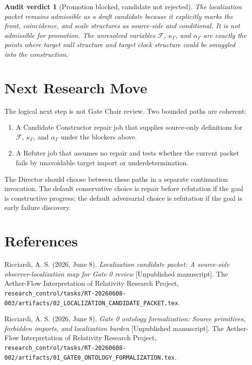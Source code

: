 \documentclass[11pt]{article}
\newcommand{\Front}{\mathcal{F}}
\newtheorem{auditverdict}{Audit verdict}
\begin{document}
\begin{auditverdict}[Promotion blocked, candidate not rejected]
The localization packet remains admissible as a draft candidate because it
explicitly marks the front, coincidence, and scale structures as source-side
and conditional. It is not admissible for promotion. The unresolved variables
\(\Front\), \(\kappa_{\Gamma}\), and \(\alpha_{\Gamma}\) are exactly the points
where target null structure and target clock structure could be smuggled into
the construction.
\end{auditverdict}

\section{Next Research Move}

The logical next step is not Gate Chair review. Two bounded paths are coherent:

\begin{enumerate}
    \item A Candidate Constructor repair job that supplies source-only
    definitions for \(\Front\), \(\kappa_{\Gamma}\), and \(\alpha_{\Gamma}\)
    under the blockers above.
    \item A Refuter job that assumes no repair and tests whether the current
    packet fails by unavoidable target import or underdetermination.
\end{enumerate}

The Director should choose between these paths in a separate continuation
invocation. The default conservative choice is repair before refutation if the
goal is constructive progress; the default adversarial choice is refutation if
the goal is early failure discovery.

\section*{References}

Ricciardi, A. S. (2026, June 8). \emph{Localization candidate packet: A
source-side observer-localization map for Gate 0 review} [Unpublished
manuscript]. The Aether-Flow Interpretation of Relativity Research Project,
\texttt{research\_control/tasks/RT-20260608-003/artifacts/02\_LOCALIZATION\_CANDIDATE\_PACKET.tex}.

Ricciardi, A. S. (2026, June 8). \emph{Gate 0 ontology formalization: Source
primitives, forbidden imports, and localization burden} [Unpublished
manuscript]. The Aether-Flow Interpretation of Relativity Research Project,
\texttt{research\_control/tasks/RT-20260608-002/artifacts/01\_GATE0\_ONTOLOGY\_FORMALIZATION.tex}.
\end{document}
